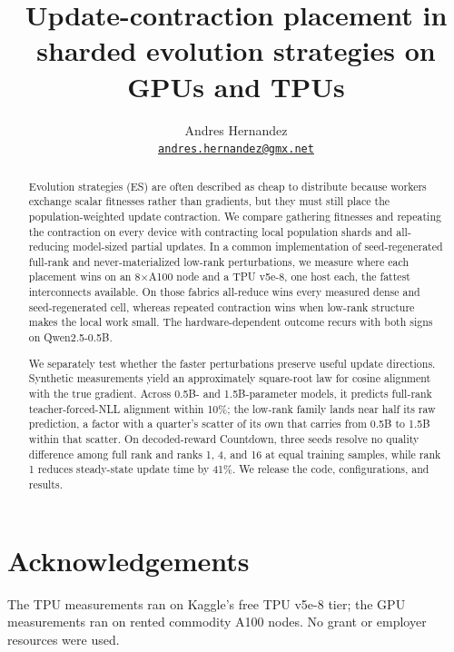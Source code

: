 \documentclass[10pt,twocolumn]{article}
\title{Update-contraction placement in sharded evolution strategies on GPUs and TPUs}
\author{Andres Hernandez\\
  \href{mailto:andres.hernandez@gmx.net}{\texttt{andres.hernandez@gmx.net}}}
\date{}
\begin{document}
\maketitle

\begin{abstract}
Evolution strategies (ES) are often described as cheap to distribute because
workers exchange scalar fitnesses rather than gradients, but they must still
place the population-weighted update contraction. We compare gathering
fitnesses and repeating the contraction on every device with contracting local
population shards and all-reducing model-sized partial updates. In a common
implementation of seed-regenerated full-rank and never-materialized low-rank
perturbations, we measure where each placement wins on an 8$\times$A100 node and a TPU
v5e-8, one host each, the fattest interconnects available. On those fabrics
all-reduce wins every measured dense and seed-regenerated cell, whereas
repeated contraction wins when low-rank structure makes the local work small.
The hardware-dependent outcome recurs with both signs on Qwen2.5-0.5B.

We separately test whether the faster perturbations preserve useful update
directions. Synthetic measurements yield an approximately square-root law for
cosine alignment with the true gradient. Across 0.5B- and 1.5B-parameter
models, it predicts full-rank teacher-forced-NLL alignment within 10\%; the
low-rank family lands near half its raw prediction, a factor with a quarter's
scatter of its own that carries from 0.5B to 1.5B within that scatter.
On decoded-reward Countdown, three seeds resolve no quality difference among
full rank and ranks 1, 4, and 16 at equal training samples, while rank 1 reduces
steady-state update time by 41\%. We release the code, configurations, and
results.
\end{abstract}











\section*{Acknowledgements}
The TPU measurements ran on Kaggle's free TPU v5e-8 tier; the GPU
measurements ran on rented commodity A100 nodes. No grant or employer
resources were used.




\appendix

\end{document}
